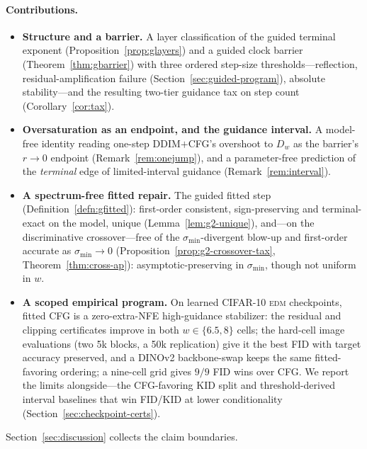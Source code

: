\documentclass{article} %
\theoremstyle{plain}
\theoremstyle{definition}
\theoremstyle{remark}
\providecommand{\smin}{\sigma_{\min}}
\providecommand{\Dw}{D_{w}}
\begin{document}
\paragraph{Contributions.}
\begin{itemize}[leftmargin=1.4em,itemsep=2pt,topsep=2pt]
\item \textbf{Structure and a barrier.} A layer classification of the guided
  terminal exponent (Proposition~\ref{prop:glayers}) and a guided clock barrier
  (Theorem~\ref{thm:gbarrier}) with three ordered step-size
  thresholds---reflection, residual-amplification failure
  (Section~\ref{sec:guided-program}), absolute stability---and the resulting
  two-tier guidance tax on step count (Corollary~\ref{cor:tax}).
\item \textbf{Oversaturation as an endpoint, and the guidance interval.} A
  model-free identity reading one-step DDIM$+$CFG's overshoot to $\Dw$ as the
  barrier's $r\to0$ endpoint (Remark~\ref{rem:onejump}), and a parameter-free
  prediction of the \emph{terminal} edge of limited-interval guidance
  \citep{kynkaanniemi2024interval} (Remark~\ref{rem:interval}).
\item \textbf{A spectrum-free fitted repair.} The guided fitted step
  (Definition~\ref{defn:gfitted}): first-order consistent, sign-preserving and
  terminal-exact on the model, unique (Lemma~\ref{lem:g2-unique}), and---on the
  discriminative crossover---free of the $\smin$-divergent blow-up and
  first-order accurate as $\smin\to0$ (Proposition~\ref{prop:g2-crossover-tax},
  Theorem~\ref{thm:cross-ap}): asymptotic-preserving in $\smin$, though not
  uniform in $w$.
\item \textbf{A scoped empirical program.} On learned CIFAR-10 \textsc{edm}
  \citep{karras2022edm} checkpoints, fitted CFG is a zero-extra-NFE high-guidance
  stabilizer: the residual and clipping certificates improve in both
  $w\in\{6.5,8\}$ cells; the
  hard-cell image evaluations (two 5k blocks, a 50k replication) give it the best
  FID with target accuracy preserved, and a DINOv2 backbone-swap keeps the same
  fitted-favoring ordering; a nine-cell grid gives $9/9$ FID wins over CFG. We
  report the
  limits alongside---the CFG-favoring KID split and threshold-derived interval
  baselines that win FID/KID at lower conditionality
  (Section~\ref{sec:checkpoint-certs}).
\end{itemize}

Section~\ref{sec:discussion} collects the claim boundaries.
\end{document}
